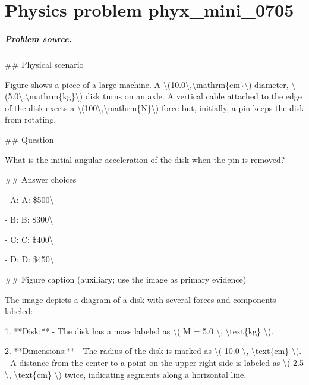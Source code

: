 
\chapter{Physics problem phyx\_mini\_0705}
\label{ch:PhyXMiniProblems_problem_phyx_mini_0705}

\paragraph{Problem source.}
\#\# Physical scenario

Figure shows a piece of a large machine. A \textbackslash{}(10.0\textbackslash{},\textbackslash{}mathrm\{cm\}\textbackslash{})-diameter, \textbackslash{}(5.0\textbackslash{},\textbackslash{}mathrm\{kg\}\textbackslash{}) disk turns on an axle. A vertical cable attached to the edge of the disk exerts a \textbackslash{}(100\textbackslash{},\textbackslash{}mathrm\{N\}\textbackslash{}) force but, initially, a pin keeps the disk from rotating.

\#\# Question

What is the initial angular acceleration of the disk when the pin is removed?

\#\# Answer choices

- A: A: \$500\textbackslash{}

- B: B: \$300\textbackslash{}

- C: C: \$400\textbackslash{}

- D: D: \$450\textbackslash{}

\#\# Figure caption (auxiliary; use the image as primary evidence)

The image depicts a diagram of a disk with several forces and components labeled:

1. **Disk:**
   - The disk has a mass labeled as \textbackslash{}( M = 5.0 \textbackslash{}, \textbackslash{}text\{kg\} \textbackslash{}).

2. **Dimensions:**
   - The radius of the disk is marked as \textbackslash{}( 10.0 \textbackslash{}, \textbackslash{}text\{cm\} \textbackslash{}).
   - A distance from the center to a point on the upper right side is labeled as \textbackslash{}( 2.5 \textbackslash{}, \textbackslash{}text\{cm\} \textbackslash{}) twice, indicating segments along a horizontal line.

